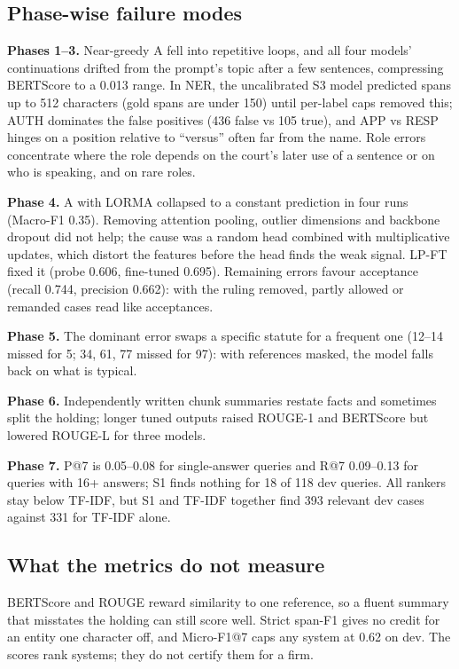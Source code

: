 \documentclass[11pt, oneside]{article}
\newcommand{\A}{\textsf{A}}\newcommand{\B}{\textsf{B}}\newcommand{\C}{\textsf{C}}\newcommand{\D}{\textsf{D}}
\begin{document}
\subsection{Phase-wise failure modes}
\textbf{Phases 1--3.} Near-greedy \A{} fell into repetitive loops, and all four models' continuations drifted from the prompt's topic after a few sentences, compressing BERTScore to a 0.013 range. In NER, the uncalibrated S3 model predicted spans up to 512 characters (gold spans are under 150) until per-label caps removed this; AUTH dominates the false positives (436 false vs 105 true), and APP vs RESP hinges on a position relative to ``versus'' often far from the name. Role errors concentrate where the role depends on the court's later use of a sentence or on who is speaking, and on rare roles.

\textbf{Phase 4.} \A{} with LORMA collapsed to a constant prediction in four runs (Macro-F1 0.35). Removing attention pooling, outlier dimensions and backbone dropout did not help; the cause was a random head combined with multiplicative updates, which distort the features before the head finds the weak signal. LP-FT fixed it (probe 0.606, fine-tuned 0.695). Remaining errors favour acceptance (recall 0.744, precision 0.662): with the ruling removed, partly allowed or remanded cases read like acceptances.

\textbf{Phase 5.} The dominant error swaps a specific statute for a frequent one (12--14 missed for 5; 34, 61, 77 missed for 97): with references masked, the model falls back on what is typical.

\textbf{Phase 6.} Independently written chunk summaries restate facts and sometimes split the holding; longer tuned outputs raised ROUGE-1 and BERTScore but lowered ROUGE-L for three models.

\textbf{Phase 7.} P@7 is 0.05--0.08 for single-answer queries and R@7 0.09--0.13 for queries with 16+ answers; S1 finds nothing for 18 of 118 dev queries. All rankers stay below TF-IDF, but S1 and TF-IDF together find 393 relevant dev cases against 331 for TF-IDF alone.

\subsection{What the metrics do not measure}
BERTScore and ROUGE reward similarity to one reference, so a fluent summary that misstates the holding can still score well. Strict span-F1 gives no credit for an entity one character off, and Micro-F1@7 caps any system at 0.62 on dev. The scores rank systems; they do not certify them for a firm.
\end{document}
